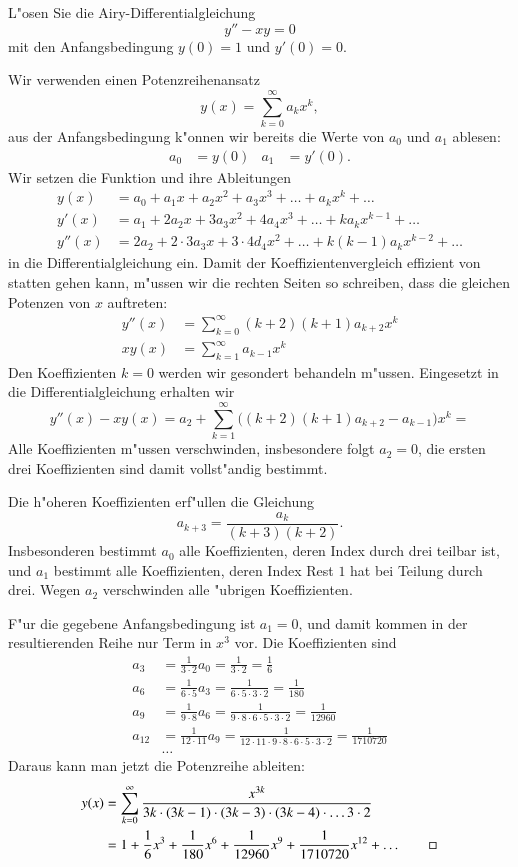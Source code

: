 L"osen Sie die Airy-Differentialgleichung
\[
y''-xy=0
\]
mit den Anfangsbedingung $y(0)=1$ und $y'(0)=0$.

\begin{loesung}
Wir verwenden einen Potenzreihenansatz
\[
y(x)=\sum_{k=0}^\infty a_kx^k,
\]
aus der Anfangsbedingung k"onnen wir bereits die Werte von $a_0$ und
$a_1$ ablesen:
\begin{align*}
a_0&=y(0)&
a_1&=y'(0).
\end{align*}
Wir setzen die Funktion und ihre Ableitungen
\begin{align*}
y(x)&=a_0+a_1x+a_2x^2+a_3x^3+\dots+a_kx^k+\dots
\\
y'(x)&=a_1+2a_2x+3a_3x^2+4a_4x^3+\dots+ka_kx^{k-1}+\dots
\\
y''(x)&=2a_2+2\cdot 3a_3x + 3\cdot 4d_4x^2+\dots +k(k-1)a_kx^{k-2}+\dots
\end{align*}
in die Differentialgleichung ein.
Damit der Koeffizientenvergleich effizient von statten gehen kann,
m"ussen wir die rechten Seiten so schreiben, dass die gleichen Potenzen
von $x$ auftreten:
\begin{align*}
y''(x)
&=
\sum_{k=0}^\infty (k+2)(k+1)a_{k+2}x^k
\\
xy(x)
&=
\sum_{k=1}^\infty a_{k-1}x^k
\end{align*}
Den Koeffizienten $k=0$ werden wir gesondert behandeln m"ussen.
Eingesetzt in die Differentialgleichung erhalten wir
\[
y''(x)-xy(x)
=
a_2 + \sum_{k=1}^\infty \bigl((k+2)(k+1)a_{k+2}-a_{k-1}\bigr)x^k=
\]
Alle Koeffizienten m"ussen verschwinden, insbesondere folgt $a_2=0$,
die ersten drei Koeffizienten sind damit vollst"andig bestimmt.

Die h"oheren Koeffizienten erf"ullen die Gleichung
\[
a_{k+3}=\frac{a_k}{(k+3)(k+2)}.
\]
Insbesonderen bestimmt $a_0$ alle Koeffizienten, deren Index durch
drei teilbar ist, und $a_1$ bestimmt alle Koeffizienten, deren Index
Rest $1$ hat bei Teilung durch drei.
Wegen $a_2$ verschwinden alle "ubrigen Koeffizienten.

F"ur die gegebene Anfangsbedingung ist $a_1=0$, und damit kommen in der
resultierenden Reihe nur Term in $x^3$ vor.
Die Koeffizienten sind
\begin{align*}
a_3&=\frac1{3\cdot 2}a_0=\frac1{3\cdot 2}=\frac16\\
a_6&=\frac1{6\cdot 5}a_3=\frac1{6\cdot 5\cdot 3\cdot 2}=\frac1{180}\\
a_9&=\frac1{9\cdot 8}a_6=\frac1{9\cdot 8\cdot 6\cdot 5\cdot 3\cdot 2}=\frac1{12960}\\
a_{12}&=\frac1{12\cdot 11}a_9=\frac1{12\cdot 11\cdot 9\cdot 8\cdot 6\cdot 5\cdot 3\cdot 2}=\frac1{1710720}
\\
&\dots
\end{align*}
Daraus kann man jetzt die Potenzreihe ableiten:
\begin{align*}
y(x)
&=
\sum_{k=0}^\infty \frac{x^{3k}}{3k\cdot(3k-1)\cdot (3k-3)\cdot(3k-4)\cdot \dots 3\cdot 2}
\\
&=
1 + \frac16x^3+\frac1{180}x^6+\frac1{12960}x^9+\frac1{1710720}x^{12}+\dots
\qedhere
\end{align*}
\end{loesung}

